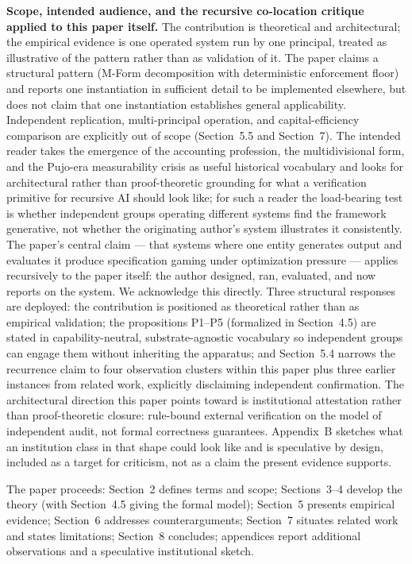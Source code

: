 \documentclass[11pt]{article}
\begin{document}
\textbf{Scope, intended audience, and the recursive co-location critique applied to this paper itself.} The contribution is theoretical and architectural; the empirical evidence is one operated system run by one principal, treated as illustrative of the pattern rather than as validation of it. The paper claims a structural pattern (M-Form decomposition with deterministic enforcement floor) and reports one instantiation in sufficient detail to be implemented elsewhere, but does not claim that one instantiation establishes general applicability. Independent replication, multi-principal operation, and capital-efficiency comparison are explicitly out of scope (Section~5.5 and Section~7). The intended reader takes the emergence of the accounting profession, the multidivisional form, and the Pujo-era measurability crisis as useful historical vocabulary and looks for architectural rather than proof-theoretic grounding for what a verification primitive for recursive AI should look like; for such a reader the load-bearing test is whether independent groups operating different systems find the framework generative, not whether the originating author's system illustrates it consistently. The paper's central claim --- that systems where one entity generates output and evaluates it produce specification gaming under optimization pressure --- applies recursively to the paper itself: the author designed, ran, evaluated, and now reports on the system. We acknowledge this directly. Three structural responses are deployed: the contribution is positioned as theoretical rather than as empirical validation; the propositions P1--P5 (formalized in Section~4.5) are stated in capability-neutral, substrate-agnostic vocabulary so independent groups can engage them without inheriting the apparatus; and Section~5.4 narrows the recurrence claim to four observation clusters within this paper plus three earlier instances from related work, explicitly disclaiming independent confirmation. The architectural direction this paper points toward is institutional attestation rather than proof-theoretic closure: rule-bound external verification on the model of independent audit, not formal correctness guarantees. Appendix~B sketches what an institution class in that shape could look like and is speculative by design, included as a target for criticism, not as a claim the present evidence supports.

The paper proceeds: Section~2 defines terms and scope; Sections~3--4 develop the theory (with Section~4.5 giving the formal model); Section~5 presents empirical evidence; Section~6 addresses counterarguments; Section~7 situates related work and states limitations; Section~8 concludes; appendices report additional observations and a speculative institutional sketch.
\end{document}
